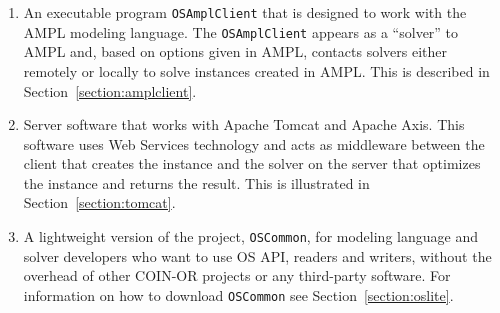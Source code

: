 \begin{enumerate}
\item{}  An executable program {\tt OSAmplClient} that is designed to work with 
the AMPL modeling language. The {\tt OSAmplClient} appears as a ``solver'' to AMPL and, based on options 
given in AMPL, contacts solvers either remotely or locally to solve instances created in AMPL. This is described in
Section~\ref{section:amplclient}.

\ifdevelop
\item{}  Server software that works with Apache Tomcat and Apache Axis.
This software uses Web Services technology and acts as middleware between the client that creates the instance
and the  solver on the server that optimizes the instance and returns the result. This is illustrated in
Section~\ref{section:tomcat}.

\item{}  A lightweight version of the project, {\tt OSCommon}, for modeling language and 
solver developers who want to use OS API, readers and writers, without the overhead of other COIN-OR projects or any 
third-party software. For information on how to download {\tt OSCommon} see Section~\ref{section:oslite}.
\fi
\end{enumerate}

